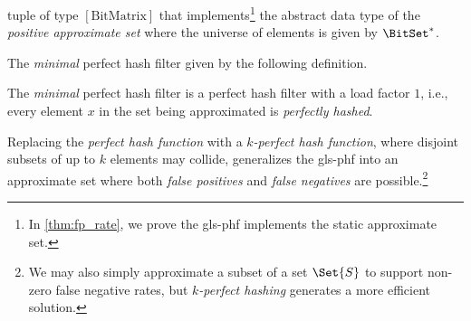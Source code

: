 \documentclass[ ../main.tex]{subfiles}
\begin{document}
tuple of type $[\textrm{BitMatrix}]$ that implements\footnote{In \cref{thm:fp_rate}, we prove the \gls{gls-phf} implements the static approximate set.} the abstract data type of the \emph{positive approximate set} where the universe of elements is given by $\BitSet^*$.


The \emph{minimal} perfect hash filter given by the following definition.
\begin{definition}
The \emph{minimal} perfect hash filter is a perfect hash filter with a load factor $1$, i.e., every element $x$ in the set being approximated is \emph{perfectly hashed}.
\end{definition}
Replacing the \emph{perfect hash function} with a \emph{$k$-perfect hash function}, where disjoint subsets of up to $k$ elements may collide, generalizes the \gls{gls-phf} into an approximate set where both \emph{false positives} and \emph{false negatives} are possible.\footnote{We may also simply approximate a subset of a set $\Set{S}$ to support non-zero false negative rates, but \emph{$k$-perfect hashing} generates a more efficient solution.}
\end{document}
